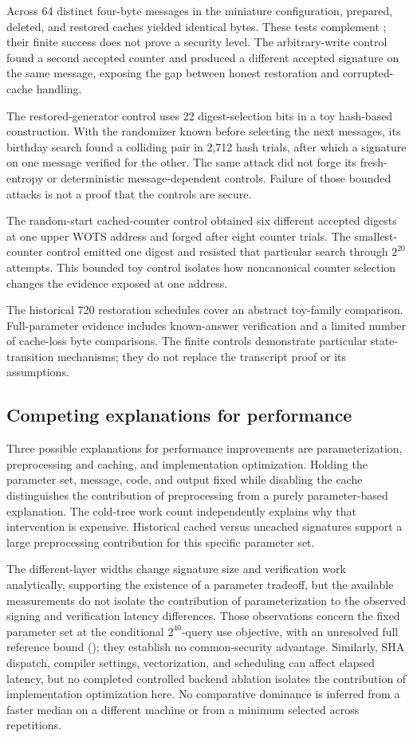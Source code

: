\documentclass[a4paper,envcountsame,runningheads]{llncs}
\begin{document}
Across 64 distinct four-byte messages in the miniature configuration, prepared, deleted, and restored caches yielded identical bytes. These tests complement ; their finite success does not prove a security level. The arbitrary-write control found a second accepted counter and produced a different accepted signature on the same message, exposing the gap between honest restoration and corrupted-cache handling.

The restored-generator control uses 22 digest-selection bits in a toy hash-based construction. With the randomizer known before selecting the next messages, its birthday search found a colliding pair in 2,712 hash trials, after which a signature on one message verified for the other. The same attack did not forge its fresh-entropy or deterministic message-dependent controls. Failure of those bounded attacks is not a proof that the controls are secure.

The random-start cached-counter control obtained six different accepted digests at one upper WOTS address and forged after eight counter trials. The smallest-counter control emitted one digest and resisted that particular search through $2^{20}$ attempts. This bounded toy control isolates how noncanonical counter selection changes the evidence exposed at one address.

The historical 720 restoration schedules cover an abstract toy-family comparison. Full-parameter evidence includes known-answer verification and a limited number of cache-loss byte comparisons. The finite controls demonstrate particular state-transition mechanisms; they do not replace the transcript proof or its assumptions.

\subsection{Competing explanations for performance}
Three possible explanations for performance improvements are parameterization, preprocessing and caching, and implementation optimization. Holding the parameter set, message, code, and output fixed while disabling the cache distinguishes the contribution of preprocessing from a purely parameter-based explanation. The cold-tree work count independently explains why that intervention is expensive. Historical cached versus uncached signatures support a large preprocessing contribution for this specific parameter set.

The different-layer widths change signature size and verification work analytically, supporting the existence of a parameter tradeoff, but the available measurements do not isolate the contribution of parameterization to the observed signing and verification latency differences. Those observations concern the fixed parameter set at the conditional $2^{40}$-query use objective, with an unresolved full reference bound (); they establish no common-security advantage. Similarly, SHA dispatch, compiler settings, vectorization, and scheduling can affect elapsed latency, but no completed controlled backend ablation isolates the contribution of implementation optimization here. No comparative dominance is inferred from a faster median on a different machine or from a minimum selected across repetitions.
\end{document}
